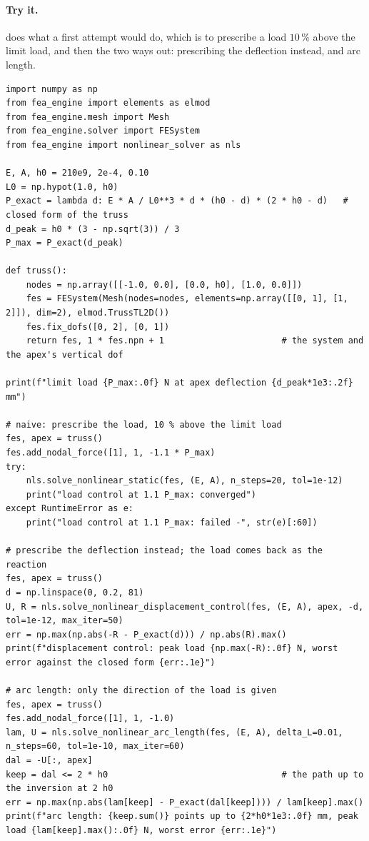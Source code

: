 \paragraph{Try it.}  does what a first attempt would do, which is to prescribe a load $10\,\%$ above the limit load, and then the two ways out: prescribing the deflection instead, and arc length.

\begin{lstlisting}[caption={The von Mises truss with \texttt{TrussTL2D}: load control past the limit load, displacement control and arc length (run with the package on the path).},label={lst:nl-vm}]
import numpy as np
from fea_engine import elements as elmod
from fea_engine.mesh import Mesh
from fea_engine.solver import FESystem
from fea_engine import nonlinear_solver as nls

E, A, h0 = 210e9, 2e-4, 0.10
L0 = np.hypot(1.0, h0)
P_exact = lambda d: E * A / L0**3 * d * (h0 - d) * (2 * h0 - d)   # closed form of the truss
d_peak = h0 * (3 - np.sqrt(3)) / 3
P_max = P_exact(d_peak)

def truss():
    nodes = np.array([[-1.0, 0.0], [0.0, h0], [1.0, 0.0]])
    fes = FESystem(Mesh(nodes=nodes, elements=np.array([[0, 1], [1, 2]]), dim=2), elmod.TrussTL2D())
    fes.fix_dofs([0, 2], [0, 1])
    return fes, 1 * fes.npn + 1                       # the system and the apex's vertical dof

print(f"limit load {P_max:.0f} N at apex deflection {d_peak*1e3:.2f} mm")

# naive: prescribe the load, 10 % above the limit load
fes, apex = truss()
fes.add_nodal_force([1], 1, -1.1 * P_max)
try:
    nls.solve_nonlinear_static(fes, (E, A), n_steps=20, tol=1e-12)
    print("load control at 1.1 P_max: converged")
except RuntimeError as e:
    print("load control at 1.1 P_max: failed -", str(e)[:60])

# prescribe the deflection instead; the load comes back as the reaction
fes, apex = truss()
d = np.linspace(0, 0.2, 81)
U, R = nls.solve_nonlinear_displacement_control(fes, (E, A), apex, -d, tol=1e-12, max_iter=50)
err = np.max(np.abs(-R - P_exact(d))) / np.abs(R).max()
print(f"displacement control: peak load {np.max(-R):.0f} N, worst error against the closed form {err:.1e}")

# arc length: only the direction of the load is given
fes, apex = truss()
fes.add_nodal_force([1], 1, -1.0)
lam, U = nls.solve_nonlinear_arc_length(fes, (E, A), delta_L=0.01, n_steps=60, tol=1e-10, max_iter=60)
dal = -U[:, apex]
keep = dal <= 2 * h0                                  # the path up to the inversion at 2 h0
err = np.max(np.abs(lam[keep] - P_exact(dal[keep]))) / lam[keep].max()
print(f"arc length: {keep.sum()} points up to {2*h0*1e3:.0f} mm, peak load {lam[keep].max():.0f} N, worst error {err:.1e}")
\end{lstlisting}


